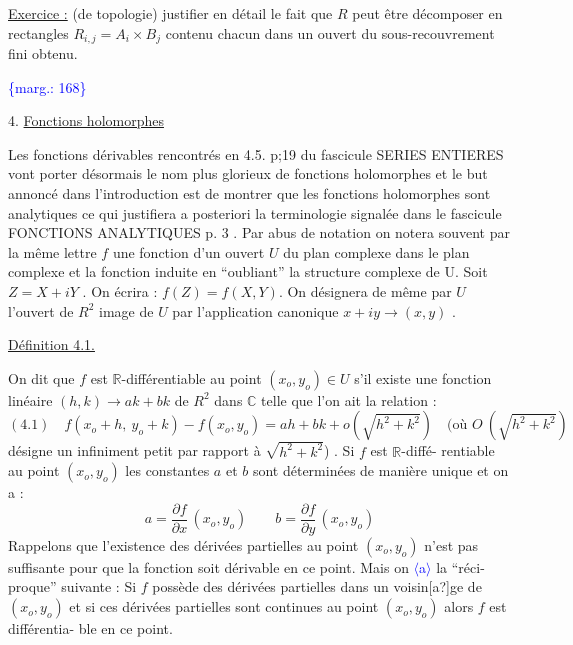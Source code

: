 \documentclass[11pt]{article}
\newcommand{\scanpage}[1]{\par\bigskip\noindent{\small\sffamily[scan #1]}\par}
\newcommand{\mspage}[1]{{\small\sffamily[p.\,#1]}}
\newcommand{\inserted}[2][]{\textcolor{blue}{$\langle$#2$\rangle$}}
\newcommand{\margin}[1]{\textcolor{blue}{\{\textsf{marg.:} #1\}}}
\newcommand{\uline}[1]{\underline{#1}}
\newcommand{\unsure}[1]{[#1?]}
\begin{document}
\uline{Exercice :} (de topologie)
justifier en détail le fait que $R$ peut être décomposer en rectangles
$R_{i,j} = A_i \times B_j$ contenu chacun dans un ouvert du sous-recouvrement fini obtenu.

\margin{168}

\clearpage
\scanpage{119/169}
\mspage{- 8 -}

4. \uline{Fonctions holomorphes}

Les fonctions dérivables rencontrés en 4.5. p;19 du fascicule
SERIES ENTIERES vont porter désormais le nom plus glorieux de fonctions
holomorphes et le but annoncé dans l'introduction est de montrer que les
fonctions holomorphes sont analytiques ce qui justifiera a posteriori la
terminologie signalée dans le fascicule FONCTIONS ANALYTIQUES p. 3 .
Par abus de notation on notera souvent par la même lettre $f$ une fonction
d'un ouvert $U$ du plan complexe dans le plan complexe et la fonction induite
en ``oubliant'' la structure complexe de U. Soit $Z = X+iY$ . On écrira :
$f(Z) = f(X,Y)$. On désignera de même par $U$ l'ouvert de $R^{2}$ image de $U$ par
l'application canonique $x+iy \rightarrow (x,y)$ .

\uline{Définition 4.1.}

On dit que $f$ est $\mathbb{R}$-différentiable au point $(x_{o},y_{o}) \in U$ s'il
existe une fonction linéaire $(h,k) \rightarrow ak + bk$ de $R^{2}$ dans $\mathbb{C}$ telle que l'on
ait la relation :
\[ (4.1) \quad f(x_{o}+h,\ y_{o}+k) - f(x_{o},y_{o}) = ah + bk + o(\sqrt{h^{2}+k^{2}}) \quad (\text{où } O\ (\sqrt{h^{2}+k^{2}}) \]
désigne un infiniment petit par rapport à $\sqrt{h^{2}+k^{2}}$) . Si $f$ est $\mathbb{R}$-diffé-%
rentiable au point $(x_{o},y_{o})$ les constantes $a$ et $b$ sont déterminées de manière
unique et on a :
\[ a = \frac{\partial f}{\partial x}\,(x_{o},y_{o}) \qquad b = \frac{\partial f}{\partial y}\,(x_{o},y_{o}) \]
Rappelons que l'existence des dérivées partielles au point $(x_{o},y_{o})$ n'est pas
suffisante pour que la fonction soit dérivable en ce point. Mais on \inserted[typed]{a} la ``réci-%
proque'' suivante :
Si $f$ possède des dérivées partielles dans un voisin\unsure{a}ge de $(x_{o},y_{o})$ et si ces
dérivées partielles sont continues au point $(x_{o},y_{o})$ alors $f$ est différentia-%
ble en ce point.
\end{document}
